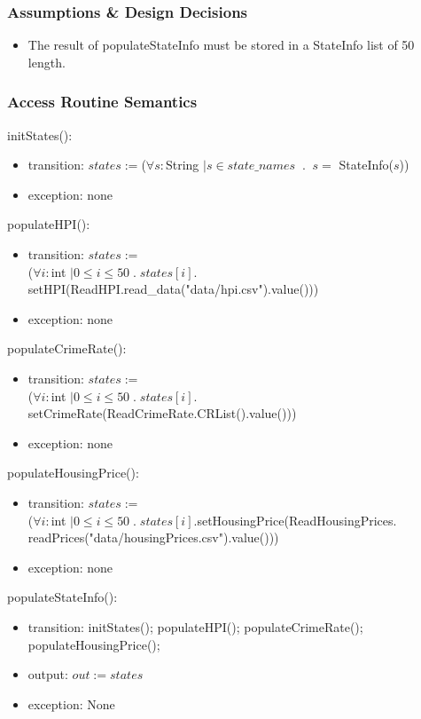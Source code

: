 \documentclass[12pt]{article}
\begin{document}
\subsubsection* {Assumptions \& Design Decisions}

\begin{itemize}
\item The result of populateStateInfo must be stored in a StateInfo list of 50 length.
\end{itemize}

\subsubsection* {Access Routine Semantics}

initStates():
\begin{itemize}
\item transition: $states := $($\forall s: $String $| s \in state\_names \;\;.\;\; s = $ StateInfo($s$))
\item exception: none
\end{itemize}

\noindent populateHPI():
\begin{itemize}
\item transition: $states := $\\($\forall i: $int $| 0 \le i \le 50 \;.\; states[i].$setHPI(ReadHPI.read\_data("data/hpi.csv").value()))
\item exception: none
\end{itemize}

\noindent populateCrimeRate():
\begin{itemize}
\item transition: $states := $\\($\forall i: $int $| 0 \le i \le 50 \;.\; states[i].$setCrimeRate(ReadCrimeRate.CRList().value()))
\item exception: none
\end{itemize}

\noindent populateHousingPrice():
\begin{itemize}
\item transition: $states := $\\($\forall i: $int $| 0 \le i \le 50 \;.\; states[i].$setHousingPrice(ReadHousingPrices.\\readPrices("data/housingPrices.csv").value()))
\item exception: none
\end{itemize}

\noindent populateStateInfo():
\begin{itemize}
\item transition: initStates(); populateHPI(); populateCrimeRate(); \\populateHousingPrice();
\item output: $\mathit{out} := states$
\item exception: None
\end{itemize}
\end{document}
